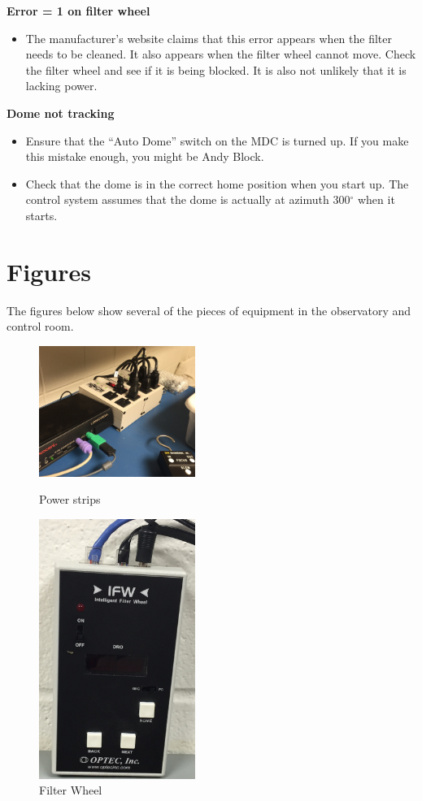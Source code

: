 \documentclass[letterpaper, 12pt]{report}
\begin{document}
\noindent\textbf{Error = 1 on filter wheel}
\begin{itemize}
	\item The manufacturer's website claims that this error appears when the filter needs to be cleaned. It also appears when the filter wheel cannot move. Check the filter wheel and see if it is being blocked. It is also not unlikely that it is lacking power.
\end{itemize}
\noindent \textbf{Dome not tracking}
\begin{itemize}
	\item Ensure that the ``Auto Dome'' switch on the MDC is turned up. If you make this mistake enough, you might be Andy Block.
	\item Check that the dome is in the correct home position when you start up. The control system assumes that the dome is actually at azimuth 300$^\circ$ when it starts.
\end{itemize}

\chapter{Figures}

The figures below show several of the pieces of equipment in the observatory and control room.

\begin{figure}
	\begin{minipage}{0.5 \linewidth}
		\includegraphics[width=2in,origin=c]{IMG_6751.JPG}
		\caption{Power strips}
	\end{minipage}
	\begin{minipage}{0.5 \linewidth}
		\includegraphics[width=2in,origin=c]{IMG_6752.JPG}
		\caption{Filter Wheel}
	\end{minipage}
\end{figure}
\end{document}
